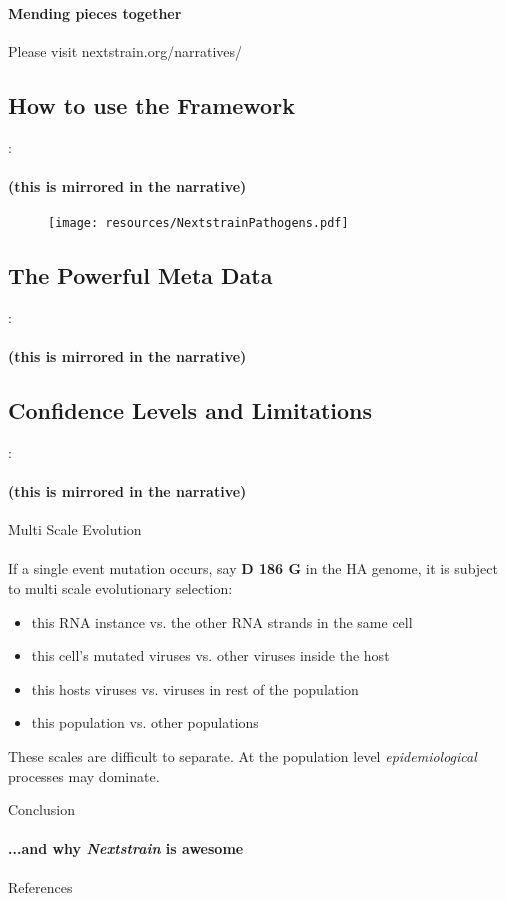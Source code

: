 \documentclass{beamer}
\begin{document}
\begin{darkframes}
    \begin{frame}{\secname}
      \framesubtitle{Mending pieces together}
      Please visit nextstrain.org/narratives/
    \end{frame}

    \subsection{How to use the Framework}
    \begin{frame}{\secname : \subsecname}
      \framesubtitle{(this is mirrored in the narrative)}
      \begin{figure}
        \texttt{[image: resources/NextstrainPathogens.pdf]}
        \caption{\footnotesize }
      \end{figure}
    \end{frame}

    \subsection{The Powerful Meta Data}
    \begin{frame}{\secname : \subsecname}
      \framesubtitle{(this is mirrored in the narrative)}
    \end{frame}

    \subsection{Confidence Levels and Limitations}
    \begin{frame}{\secname : \subsecname}
      \framesubtitle{(this is mirrored in the narrative)}
    \end{frame}

    \begin{frame}{Multi Scale Evolution}
      \framesubtitle{}
      If a single event mutation occurs, say \textbf{D 186 G} in the HA genome, it is subject to multi scale evolutionary selection:
      \begin{itemize}
        \item this RNA instance vs. the other RNA strands in the same cell
        \item this cell's mutated viruses vs. other viruses inside the host
        \item this hosts viruses vs. viruses in rest of the population
        \item this population vs. other populations
      \end{itemize}
      These scales are difficult to separate. At the population level \textit{epidemiological} processes may dominate.
    \end{frame}

    \begin{frame}{Conclusion}
      \framesubtitle{...and why \textit{Nextstrain} is awesome}
    \end{frame}

    \begin{frame}[allowframebreaks]{References}
    \tiny


    \end{frame}




  \end{darkframes}
\end{document}
